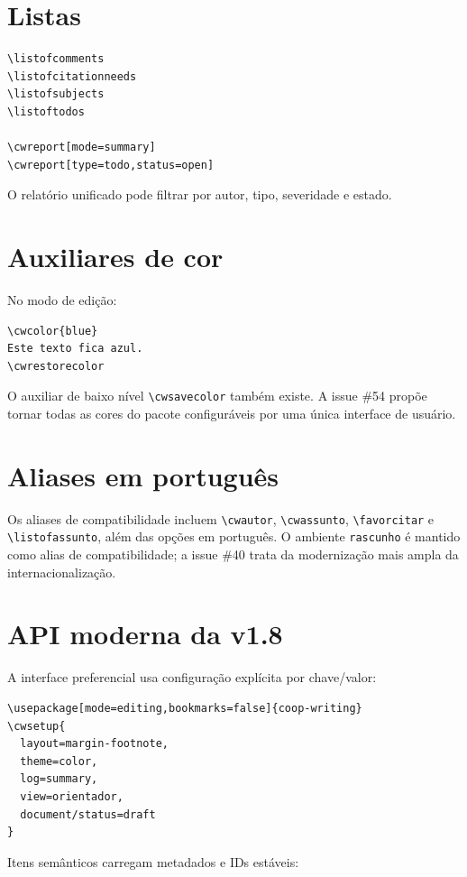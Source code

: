 \documentclass[11pt]{article}
\newcommand{\cmd}[1]{\texttt{\textbackslash#1}}
\begin{document}
\section*{Listas}

\begin{verbatim}
\listofcomments
\listofcitationneeds
\listofsubjects
\listoftodos

\cwreport[mode=summary]
\cwreport[type=todo,status=open]
\end{verbatim}

O relatório unificado pode filtrar por autor, tipo, severidade e estado.

\section*{Auxiliares de cor}

No modo de edição:

\begin{verbatim}
\cwcolor{blue}
Este texto fica azul.
\cwrestorecolor
\end{verbatim}

O auxiliar de baixo nível \cmd{cwsavecolor} também existe. A issue \#54 propõe tornar todas as cores do pacote configuráveis por uma única interface de usuário.

\section*{Aliases em português}

Os aliases de compatibilidade incluem \cmd{cwautor}, \cmd{cwassunto}, \cmd{favorcitar} e \cmd{listofassunto}, além das opções em português. O ambiente \texttt{rascunho} é mantido como alias de compatibilidade; a issue \#40 trata da modernização mais ampla da internacionalização.

\section*{API moderna da v1.8}

A interface preferencial usa configuração explícita por chave/valor:

\begin{verbatim}
\usepackage[mode=editing,bookmarks=false]{coop-writing}
\cwsetup{
  layout=margin-footnote,
  theme=color,
  log=summary,
  view=orientador,
  document/status=draft
}
\end{verbatim}

Itens semânticos carregam metadados e IDs estáveis:
\end{document}
